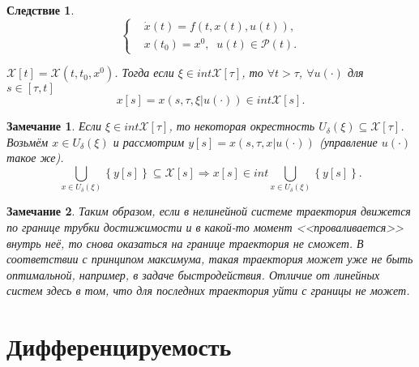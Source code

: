 \documentclass[12pt, a4paper]{article}
\theoremstyle{rusdef}
\newtheorem{remark}{Замечание}
\newtheorem{corol}{Следствие}
\renewcommand{\P}{\mathscr{P}} %
\DeclareMathOperator*{\thus}{\Rightarrow} %
\begin{document}
\begin{corol}
$$
\left\{
\begin{aligned}
& \dot{x}(t) = f(t, x(t), u(t)), \\
& x(t_0) = x^0, \;\; u(t) \in \P(t).
\end{aligned}
\right.
$$

$\mathscr{X}[t] = \mathscr{X}(t, t_0, x^0)$. Тогда если $\xi \in int \mathscr{X}[\tau]$, то $\forall t > \tau$, $\forall u(\cdot)$ для $s \in [\tau, t]$
$$
x[s] = x(s, \tau, \xi \rvert u(\cdot)) \in int \mathscr{X}[s].
$$
\end{corol}

\begin{remark}
Если $\xi \in int \mathscr{X}[\tau]$, то некоторая окрестность $U_{\delta}(\xi) \subseteq \mathscr{X}[\tau]$. Возьмём $x \in U_{\delta}(\xi)$ и рассмотрим $y[s] = x(s, \tau, x \rvert u(\cdot))$ \textit{(управление $u(\cdot)$ такое же)}.
$$
\bigcup\limits_{x \in U_{\delta}(\xi)} \left\{ y[s] \right\} \subseteq \mathscr{X}[s]
\thus
x[s] \in int \bigcup\limits_{x \in U_{\delta}(\xi)} \left\{ y[s] \right\}.
$$
\end{remark}

\begin{remark}
Таким образом, если в нелинейной системе траектория движется по границе трубки достижимости и в какой-то момент <<проваливается>> внутрь неё, то снова оказаться на границе траектория не сможет. В соответствии с принципом максимума, такая траектория может уже не быть оптимальной, например, в задаче быстродействия. Отличие от линейных систем здесь в том, что для последних траектория уйти с границы не может.
\end{remark}

\section{Дифференцируемость}
\end{document}
